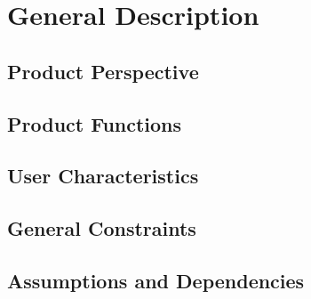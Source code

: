 \section{General Description}
  \subsection{Product Perspective}
  \subsection{Product Functions}
  \subsection{User Characteristics}
  \subsection{General Constraints}
  \subsection{Assumptions and Dependencies}
